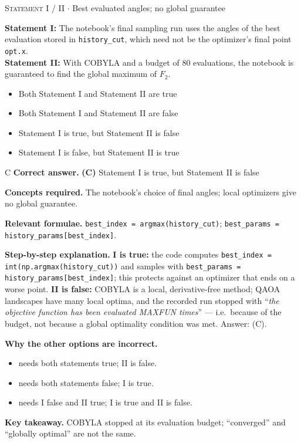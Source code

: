 \documentclass[11pt,a4paper]{article}
\newcommand{\optlabel}[1]{\textbf{(#1)}}
\newcommand{\correctlabel}[1]{\textcolor{okgreen}{\textbf{(#1)}\,\ding{51}}}
\newenvironment{qitem}[1]{\begin{list}{}{\setlength{\leftmargin}{3.3em}\setlength{\labelwidth}{3.1em}%
  \setlength{\labelsep}{0.2em}\setlength{\topsep}{3pt}\setlength{\parsep}{3pt}}\item[\textbf{Q.#1}\hfill]}{\end{list}}
\newcommand{\qsep}{\par\vspace{2pt}{\color{black!15}\hrule}\vspace{4pt}}
\newcommand{\qmeta}[2]{{\footnotesize\color{black!60}\textsc{#1} \;$\cdot$\; #2}\par}
\begin{document}
\qsep

\begin{qitem}{58}
\qmeta{Statement I / II}{Best evaluated angles; no global guarantee}
\textbf{Statement I:} The notebook's final sampling run uses the angles of the best evaluation stored in
\texttt{history\_cut}, which need not be the optimizer's final point \texttt{opt.x}.\\[1mm]
\textbf{Statement II:} With COBYLA and a budget of 80 evaluations, the notebook is guaranteed to find the global maximum of $F_2$.
\begin{itemize}[leftmargin=2.6em, labelsep=0.4em, itemsep=2pt, topsep=3pt]
\item[\optlabel{A}] Both Statement I and Statement II are true
\item[\optlabel{B}] Both Statement I and Statement II are false
\item[\correctlabel{C}] Statement I is true, but Statement II is false
\item[\optlabel{D}] Statement I is false, but Statement II is true
\end{itemize}
\end{qitem}
\begin{solbox}{C}
\textbf{\color{brand}Correct answer.} \textcolor{okgreen}{\textbf{(C)}} Statement I is true, but Statement II is false

\textbf{\color{brand}Concepts required.} The notebook's choice of final angles; local optimizers give no global guarantee.

\textbf{\color{brand}Relevant formulae.} \texttt{best\_index = argmax(history\_cut)}; \texttt{best\_params = history\_params[best\_index]}.

\textbf{\color{brand}Step-by-step explanation.} \textbf{I is true:} the code computes \texttt{best\_index = int(np.argmax(history\_cut))} and samples with
\texttt{best\_params = history\_params[best\_index]}; this protects against an optimizer that ends on a worse point.
\textbf{II is false:} COBYLA is a local, derivative-free method; QAOA landscapes have many local optima, and the recorded run
stopped with ``\emph{the objective function has been evaluated MAXFUN times}'' --- i.e.\ because of the budget, not because a global
optimality condition was met. Answer: (C).

\textbf{\color{brand}Why the other options are incorrect.}
\begin{itemize}[leftmargin=2.4em, itemsep=1pt, topsep=2pt]
\item[\textbf{(A)}] needs both statements true; II is false.
\item[\textbf{(B)}] needs both statements false; I is true.
\item[\textbf{(D)}] needs I false and II true; I is true and II is false.
\end{itemize}
\textbf{\color{brand}Key takeaway.} COBYLA stopped at its evaluation budget; ``converged'' and ``globally optimal'' are not the same.
\end{solbox}
\qsep
\end{document}
